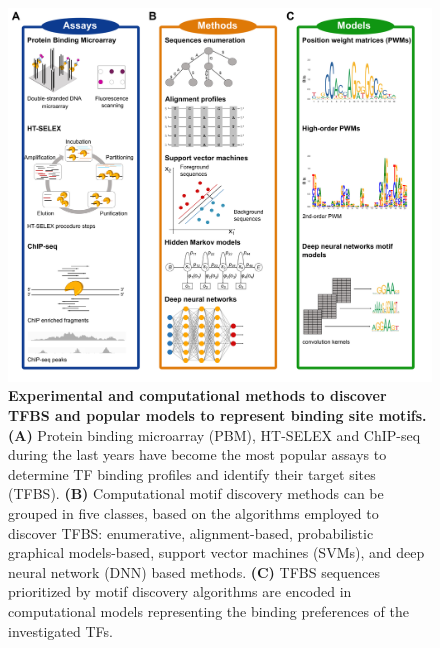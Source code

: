 \documentclass[a4paper, titlepage, 8pt, openright]{book}
\begin{document}
\begin{figure}
	\centering
	\includegraphics[width=\textwidth]{figures/md.png}
	\caption[Experimental and computational methods to discover TFBS and popular models to represent binding site motifs.]{\textbf{Experimental and computational methods to discover TFBS and popular models to represent binding site motifs. (A)} Protein binding microarray (PBM), HT-SELEX and ChIP-seq during the last years have become the most popular assays to determine TF binding profiles and identify their target sites (TFBS). \textbf{(B)} Computational motif discovery methods can be grouped in five classes, based on the algorithms employed to discover TFBS: enumerative, alignment-based, probabilistic graphical models-based, support vector machines (SVMs), and deep neural network (DNN) based methods. \textbf{(C)} TFBS sequences prioritized by motif discovery algorithms are encoded in computational models representing the binding preferences of the investigated TFs. }
	\label{fig:md}
\end{figure}
\end{document}
